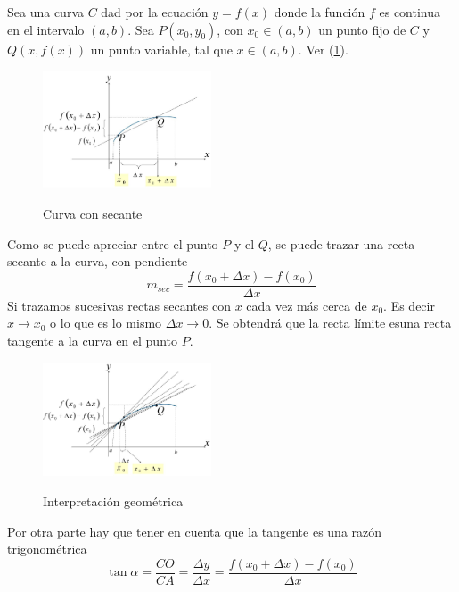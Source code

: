 \documentclass[10pt,twoside]{SelfArx} %
\begin{document}
Sea una curva $ C $ dad por la ecuación $ y=f(x) $ donde la función $ f $ es continua en el intervalo $ (a,b) $. Sea $ P(x_{0},y_{0})$,  con $ x_{0}\in(a,b) $ un punto fijo de $ C $ y $ Q(x,f(x)) $ un punto variable, tal que $ x\in(a,b) $. Ver (\ref{curva_con_secante}).\\
\begin{figure}[h]
	\includegraphics[width=5cm]{curva_con_secante} \label{curva_con_secante}
	\caption{Curva con secante}
\end{figure}
Como se puede apreciar entre el punto $ P $ y el $ Q $, se puede trazar una recta secante a la curva, con pendiente
\[ m_{sec}=\dfrac{f(x_{0}+\Delta x)-f(x_{0})}{\Delta x} \]
Si trazamos sucesivas rectas secantes con $ x $ cada vez más cerca de $ x_{0} $. Es decir $ x\rightarrow x_{0} $ o lo que es lo mismo $ \Delta x\rightarrow0 $. Se obtendr\'a que la recta límite esuna recta tangente a la curva en el punto $ P $.

\begin{figure}[h]
	\centering
	\includegraphics[width=5cm]{curvas_con_secantes}
	\label{curvas_con_secantes}
	\caption{Interpretaci\'on geom\'etrica}
\end{figure}



Por otra parte hay que tener en cuenta que la tangente es una razón trigonométrica
\begin{equation}
\tan\alpha=\dfrac{CO}{CA}=\dfrac{\Delta y}{\Delta x}=\dfrac{f(x_{0}+\Delta x)-f(x_{0})}{\Delta x}
\end{equation}
\end{document}
